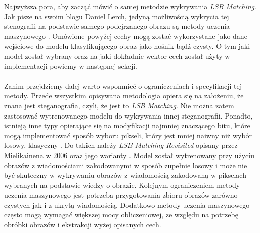         
        Najwyższa pora, aby zacząć mówić o samej metodzie wykrywania \textit{LSB Matching}. Jak pisze na swoim blogu Daniel Lerch, jedyną możliwością wykrycia tej stenografii na podstawie samego podejrzanego obrazu są metody uczenia maszynowego \cite{daniel}. Omówione powyżej cechy mogą zostać wykorzystane jako dane wejściowe do modelu klasyfikującego obraz jako nośnik bądź czysty. O tym jaki model został wybrany oraz na jaki dokładnie wektor cech został użyty w implementacji powiemy w następnej sekcji. \\
        \\
        Zanim przejdziemy dalej warto wspomnieć o ograniczeniach i specyfikacji tej metody. Przede wszystkim opisywana metodologia opiera się na założeniu, że znana jest steganografia, czyli, że jest to \textit{LSB Matching}. Nie można zatem zastosować wytrenowanego modelu do wykrywania innej steganografii. Ponadto, istnieją inne typy opierające się na modyfikacji najmniej znaczącego bitu, które mogą implementować sposób wyboru pikseli, który jest mniej naiwny niż wybór losowy, klasyczny \cite{kombrink}. Do takich należy \textit{LSB Matching Revisited} opisany przez Mielikainena w 2006 oraz jego warianty \cite{LSBR, LSBRR}. Model został wytrenowany przy użyciu obrazów z wiadomościami zakodowanymi w sposób zupełnie losowy i może nie być skuteczny w wykrywaniu obrazów z wiadomością zakodowaną w pikselach wybranych na podstawie wiedzy o obrazie. Kolejnym ograniczeniem metody uczenia maszynowego jest potrzeba przygotowania zbioru obrazów zarówno czystych jak i z ukrytą wiadomością. Dodatkowo metody uczenia maszynowego często mogą wymagać większej mocy obliczeniowej, ze względu na potrzebę obróbki obrazów i ekstrakcji wyżej opisanych cech.

